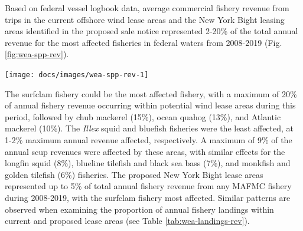 \documentclass[
  10pt,
]{article}
\let\origfigure\figure
\let\endorigfigure\endfigure
\renewenvironment{figure}[1][2] {
    \expandafter\origfigure\expandafter[H]
} {
    \endorigfigure
}
\begin{document}
Based on federal vessel logbook data, average commercial fishery revenue
from trips in the current offshore wind lease areas and the New York
Bight leasing areas identified in the proposed sale notice represented
2-20\% of the total annual revenue for the most affected fisheries in
federal waters from 2008-2019 (Fig. \ref{fig:wea-spp-rev}).

\begin{figure}

{\centering \texttt{[image: docs/images/wea-spp-rev-1]} 

}

\caption{Wind energy revenue in the Mid-Atlantic.}\label{fig:wea-spp-rev}
\end{figure}

The surfclam fishery could be the most affected fishery, with a maximum
of 20\% of annual fishery revenue occurring within potential wind lease
areas during this period, followed by chub mackerel (15\%), ocean quahog
(13\%), and Atlantic mackerel (10\%). The \emph{Illex} squid and
bluefish fisheries were the least affected, at 1-2\% maximum annual
revenue affected, respectively. A maximum of 9\% of the annual scup
revenues were affected by these areas, with similar effects for the
longfin squid (8\%), blueline tilefish and black sea bass (7\%), and
monkfish and golden tilefish (6\%) fisheries. The proposed New York
Bight lease areas represented up to 5\% of total annual fishery revenue
from any MAFMC fishery during 2008-2019, with the surfclam fishery most
affected. Similar patterns are observed when examining the proportion of
annual fishery landings within current and proposed lease areas (see
Table \ref{tab:wea-landings-rev}).
\end{document}
